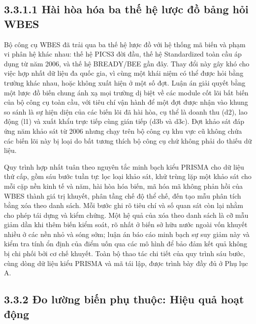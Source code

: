 \documentclass[
  a4paper,
  13pt]{extreport}
\begin{document}
\hypertarget{huxe0i-huxf2a-huxf3a-ba-thux1ebf-hux1ec7-lux1b0ux1ee3c-ux111ux1ed3-bux1ea3ng-hux1ecfi-wbes}{%
\subsection{3.3.1.1 Hài hòa hóa ba thế hệ lược đồ bảng hỏi
WBES}\label{huxe0i-huxf2a-huxf3a-ba-thux1ebf-hux1ec7-lux1b0ux1ee3c-ux111ux1ed3-bux1ea3ng-hux1ecfi-wbes}}

Bộ công cụ WBES đã trải qua ba thế hệ lược đồ với hệ thống mã biến và
phạm vi phân hệ khác nhau: thế hệ PICS3 đời đầu, thế hệ Standardized
toàn cầu áp dụng từ năm 2006, và thế hệ BREADY/BEE gần đây. Thay đổi này
gây khó cho việc hợp nhất dữ liệu đa quốc gia, vì cùng một khái niệm có
thể được hỏi bằng trường khác nhau, hoặc không xuất hiện ở một số đợt.
Luận án giải quyết bằng một lược đồ biến chung ánh xạ mọi trường dị biệt
về các module cốt lõi bất biến của bộ công cụ toàn cầu, với tiêu chí vận
hành để một đợt được nhận vào khung so sánh là sự hiện diện của các biến
lõi đã hài hòa, cụ thể là doanh thu (d2), lao động (l1) và xuất khẩu
trực tiếp cùng gián tiếp (d3b và d3c). Đợt khảo sát đáp ứng năm khảo sát
từ 2006 nhưng chạy trên bộ công cụ khu vực cũ không chứa các biến lõi
này bị loại do bất tương thích bộ công cụ chứ không phải do thiếu dữ
liệu.

Quy trình hợp nhất tuân theo nguyên tắc minh bạch kiểu PRISMA cho dữ
liệu thứ cấp, gồm sáu bước tuần tự: lọc loại khảo sát, khử trùng lặp một
khảo sát cho mỗi cặp nền kinh tế và năm, hài hòa hóa biến, mã hóa mã
không phản hồi của WBES thành giá trị khuyết, phân tầng chế độ thể chế,
đến tạo mẫu phân tích bằng xóa theo danh sách. Mỗi bước ghi rõ tiêu chí
và số quan sát còn lại nhằm cho phép tái dựng và kiểm chứng. Một hệ quả
của xóa theo danh sách là cỡ mẫu giảm dần khi thêm biến kiểm soát, rõ
nhất ở biến sở hữu nước ngoài vốn khuyết nhiều ở các nền nhỏ và sóng
sớm; luận án báo cáo minh bạch sự suy giảm này và kiểm tra tính ổn định
của điểm uốn qua các mô hình để bảo đảm kết quả không bị chi phối bởi cơ
chế khuyết. Toàn bộ thao tác chi tiết của quy trình sáu bước, cùng dòng
dữ liệu kiểu PRISMA và mã tái lập, được trình bày đầy đủ ở Phụ lục A.

\hypertarget{ux111o-lux1b0ux1eddng-biux1ebfn-phux1ee5-thuux1ed9c-hiux1ec7u-quux1ea3-houx1ea1t-ux111ux1ed9ng}{%
\subsection{3.3.2 Đo lường biến phụ thuộc: Hiệu quả hoạt
động}\label{ux111o-lux1b0ux1eddng-biux1ebfn-phux1ee5-thuux1ed9c-hiux1ec7u-quux1ea3-houx1ea1t-ux111ux1ed9ng}}
\end{document}
